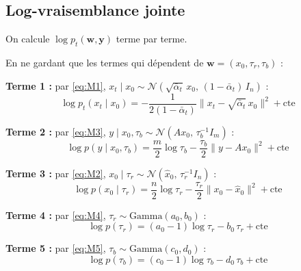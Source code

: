\documentclass[12pt]{article}
\begin{document}
\subsection{Log-vraisemblance jointe}

On calcule $\log p_t(\boldsymbol{w}, \boldsymbol{y})$ terme par terme.

\begin{propositionbox}
\label{prop:logterms}
En ne gardant que les termes qui dépendent de $\boldsymbol{w} = (x_0, \tau_r, \tau_b)$ 
:

\textbf{Terme 1 
:} par \ref{eq:M1}, $x_t \mid x_0 \sim \mathcal{N}(\sqrt{\bar\alpha_t}\, x_0,\, (1-\bar\alpha_t)\, I_n)$ 
:
\begin{equation}
    \log p_t(x_t \mid x_0) = -\frac{1}{2(1-\bar\alpha_t)} \|x_t - \sqrt{\bar\alpha_t}\, x_0\|^2 + \mathrm{cte}
\end{equation}

\textbf{Terme 2 
:} par \ref{eq:M3}, $y \mid x_0, \tau_b \sim \mathcal{N}(Ax_0,\, \tau_b^{-1} I_m)$ 
:
\begin{equation}
    \log p(y \mid x_0, \tau_b) = \frac{m}{2}\log \tau_b - \frac{\tau_b}{2}\|y - Ax_0\|^2 + \mathrm{cte}
\end{equation}

\textbf{Terme 3 
:} par \ref{eq:M2}, $x_0 \mid \tau_r \sim \mathcal{N}(\hat{x}_0,\, \tau_r^{-1} I_n)$ 
:
\begin{equation}
    \log p(x_0 \mid \tau_r) = \frac{n}{2}\log \tau_r - \frac{\tau_r}{2}\|x_0 - \hat{x}_0\|^2 + \mathrm{cte}
\end{equation}

\textbf{Terme 4 
:} par \ref{eq:M4}, $\tau_r \sim \mathrm{Gamma}(a_0, b_0)$ 
:
\begin{equation}
    \log p(\tau_r) = (a_0 - 1)\log \tau_r - b_0\, \tau_r + \mathrm{cte}
\end{equation}

\textbf{Terme 5 
:} par \ref{eq:M5}, $\tau_b \sim \mathrm{Gamma}(c_0, d_0)$ 
:
\begin{equation}
    \log p(\tau_b) = (c_0 - 1)\log \tau_b - d_0\, \tau_b + \mathrm{cte}
\end{equation}
\end{propositionbox}
\end{document}
